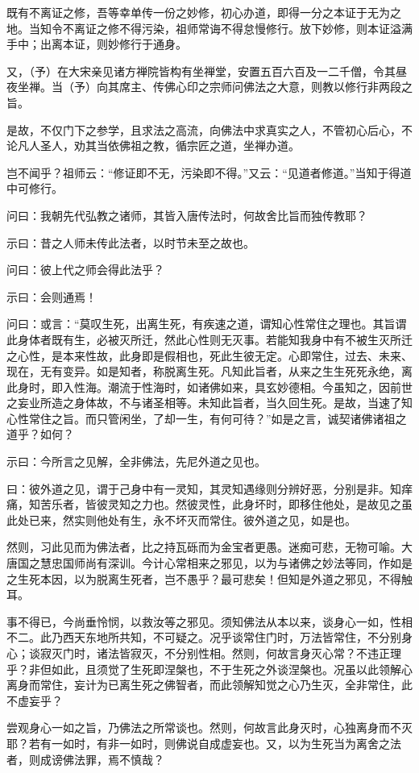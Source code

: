既有不离证之修，吾等幸单传一份之妙修，初心办道，即得一分之本证于无为之地。当知令不离证之修不得污染，祖师常诲不得怠慢修行。放下妙修，则本证溢满手中；出离本证，则妙修行于通身。

又，（予）在大宋亲见诸方禅院皆构有坐禅堂，安置五百六百及一二千僧，令其昼夜坐禅。当（予）向其席主、传佛心印之宗师问佛法之大意，则教以修行非两段之旨。

是故，不仅门下之参学，且求法之高流，向佛法中求真实之人，不管初心后心，不论凡人圣人，劝其当依佛祖之教，循宗匠之道，坐禅办道。

岂不闻乎？祖师云：“修证即不无，污染即不得。”又云：“见道者修道。”当知于得道中可修行。

问曰：我朝先代弘教之诸师，其皆入唐传法时，何故舍比旨而独传教耶？

示曰：昔之人师未传此法者，以时节未至之故也。

问曰：彼上代之师会得此法乎？

示曰：会则通焉！

问曰：或言：“莫叹生死，出离生死，有疾速之道，谓知心性常住之理也。其旨谓此身体者既有生，必被灭所迁，然此心性则无灭事。若能知我身中有不被生灭所迁之心性，是本来性故，此身即是假相也，死此生彼无定。心即常住，过去、未来、现在，无有变异。如是知者，称脱离生死。凡知此旨者，从来之生生死死永绝，离此身时，即入性海。潮流于性海时，如诸佛如来，具玄妙德相。今虽知之，因前世之妄业所造之身体故，不与诸圣相等。未知此旨者，当久回生死。是故，当速了知心性常住之旨。而只管闲坐，了却一生，有何可待？”如是之言，诚契诸佛诸祖之道乎？如何？

示曰：今所言之见解，全非佛法，先尼外道之见也。

曰：彼外道之见，谓于己身中有一灵知，其灵知遇缘则分辨好恶，分别是非。知痒痛，知苦乐者，皆彼灵知之力也。然彼灵性，此身坏时，即移住他处，是故见之虽此处已来，然实则他处有生，永不坏灭而常住。彼外道之见，如是也。

然则，习此见而为佛法者，比之持瓦砾而为金宝者更愚。迷痴可悲，无物可喻。大唐国之慧忠国师尚有深训。今计心常相来之邪见，以为与诸佛之妙法等同，作如是之生死本因，以为脱离生死者，岂不愚乎？最可悲矣！但知是外道之邪见，不得触耳。

事不得已，今尚垂怜悯，以救汝等之邪见。须知佛法从本以来，谈身心一如，性相不二。此乃西天东地所共知，不可疑之。况乎谈常住门时，万法皆常住，不分别身心；谈寂灭门时，诸法皆寂灭，不分别性相。然则，何故言身灭心常？不违正理乎？非但如此，且须觉了生死即涅槃也，不于生死之外谈涅槃也。况虽以此领解心离身而常住，妄计为已离生死之佛智者，而此领解知觉之心乃生灭，全非常住，此不虚妄乎？

尝观身心一如之旨，乃佛法之所常谈也。然则，何故言此身灭时，心独离身而不灭耶？若有一如时，有非一如时，则佛说自成虚妄也。又，以为生死当为离舍之法者，则成谤佛法罪，焉不慎哉？

